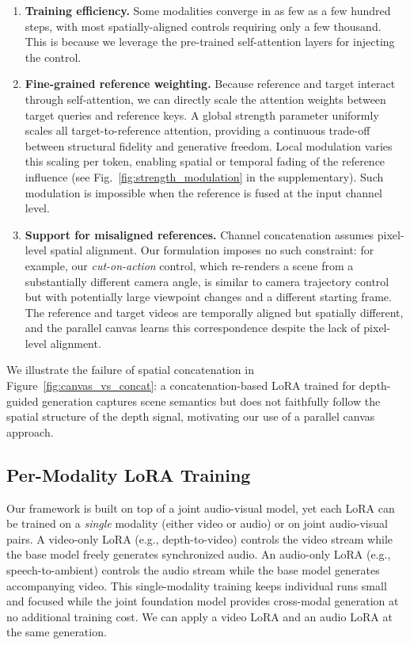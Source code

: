 \begin{enumerate}
    \item \textbf{Training efficiency.} Some modalities converge in as few as a few hundred steps, with most spatially-aligned controls requiring only a few thousand. This is because we leverage the pre-trained self-attention layers for injecting the control.

    \item \textbf{Fine-grained reference weighting.} Because reference and target interact through self-attention, we can directly scale the attention weights between target queries and reference keys. A global strength parameter uniformly scales all target-to-reference attention, providing a continuous trade-off between structural fidelity and generative freedom. Local modulation varies this scaling per token, enabling spatial or temporal fading of the reference influence (see Fig.~\ref{fig:strength_modulation} in the supplementary). Such modulation is impossible when the reference is fused at the input channel level.

    \item \textbf{Support for misaligned references.} Channel concatenation assumes pixel-level spatial alignment. Our formulation imposes no such constraint: for example, our \emph{cut-on-action} control, which re-renders a scene from a substantially different camera angle, is similar to camera trajectory control but with potentially large viewpoint changes and a different starting frame. The reference and target videos are temporally aligned but spatially different, and the parallel canvas learns this correspondence despite the lack of pixel-level alignment.
\end{enumerate}



\noindent We illustrate the failure of spatial concatenation in Figure~\ref{fig:canvas_vs_concat}: a concatenation-based LoRA trained for depth-guided generation captures scene semantics but does not faithfully follow the spatial structure of the depth signal, motivating our use of a parallel canvas approach.

\subsection{Per-Modality LoRA Training}
Our framework is built on top of a joint audio-visual model, yet each LoRA can be trained on a \emph{single} modality (either video or audio) or on joint audio-visual pairs. A video-only LoRA (e.g., depth-to-video) controls the video stream while the base model freely generates synchronized audio. An audio-only LoRA (e.g., speech-to-ambient) controls the audio stream while the base model generates accompanying video. This single-modality training keeps individual runs small and focused while the joint foundation model provides cross-modal generation at no additional training cost. We can apply a video LoRA and an audio LoRA at the same generation.

